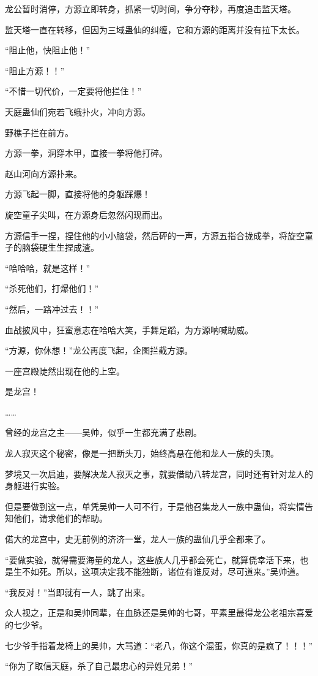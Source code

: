 \begin{this_body}
龙公暂时消停，方源立即转身，抓紧一切时间，争分夺秒，再度追击监天塔。

监天塔一直在转移，但因为三域蛊仙的纠缠，它和方源的距离并没有拉下太长。

“阻止他，快阻止他！”

“阻止方源！！”

“不惜一切代价，一定要将他拦住！”

天庭蛊仙们宛若飞蛾扑火，冲向方源。

野樵子拦在前方。

方源一拳，洞穿木甲，直接一拳将他打碎。

赵山河向方源扑来。

方源飞起一脚，直接将他的身躯踩爆！

旋空童子尖叫，在方源身后忽然闪现而出。

方源信手一捏，捏住他的小小脑袋，然后砰的一声，方源五指合拢成拳，将旋空童子的脑袋硬生生捏成渣。

“哈哈哈，就是这样！”

“杀死他们，打爆他们！”

“然后，一路冲过去！！”

血战披风中，狂蛮意志在哈哈大笑，手舞足蹈，为方源呐喊助威。

“方源，你休想！”龙公再度飞起，企图拦截方源。

一座宫殿陡然出现在他的上空。

是龙宫！

……

曾经的龙宫之主——吴帅，似乎一生都充满了悲剧。

龙人寂灭这个秘密，像是一把断头刀，始终高悬在他和龙人一族的头顶。

梦境又一次启迪，要解决龙人寂灭之事，就要借助八转龙宫，同时还有针对龙人的身躯进行实验。

但是要做到这一点，单凭吴帅一人可不行，于是他召集龙人一族中蛊仙，将实情告知他们，请求他们的帮助。

偌大的龙宫中，史无前例的济济一堂，龙人一族的蛊仙几乎全都来了。

“要做实验，就得需要海量的龙人，这些族人几乎都会死亡，就算侥幸活下来，也是生不如死。所以，这项决定我不能独断，诸位有谁反对，尽可道来。”吴帅道。

“我反对！”当即就有一人，跳了出来。

众人视之，正是和吴帅同辈，在血脉还是吴帅的七哥，平素里最得龙公老祖宗喜爱的七少爷。

七少爷手指着龙椅上的吴帅，大骂道：“老八，你这个混蛋，你真的是疯了！！！”

“你为了取信天庭，杀了自己最忠心的异姓兄弟！”


\end{this_body}
